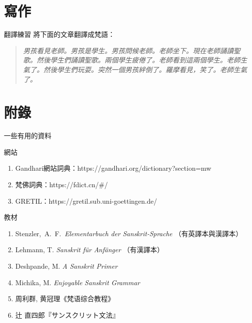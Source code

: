 \documentclass[aspectratio=169]{beamer}
\begin{document}
\section{寫作}
\begin{frame}{翻譯練習}
    將下面的文章翻譯成梵語：
    \begin{quotation}
        \rmfamily\itshape
        男孩看見老師。男孩是學生。男孩問候老師。老師坐下。現在老師誦讀聖歌。然後學生們誦讀聖歌。兩個學生疲倦了。老師看到這兩個學生。老師生氣了。然後學生們玩耍。突然一個男孩絆倒了。羅摩看見，笑了。老師生氣了。
    \end{quotation}
\end{frame}

\section{附錄}
\begin{frame}{一些有用的資料}
    \begin{block}{網站}
        \begin{enumerate}
            \item Gandhari網站詞典：https://gandhari.org/dictionary?section=mw
            \item 梵佛詞典：https://fdict.cn/\#/
            \item GRETIL：https://gretil.sub.uni-goettingen.de/
        \end{enumerate}
    \end{block}

    \begin{block}{教材}
        \begin{enumerate}
            \item Stenzler, A. F. \textit{Elementarbuch der Sanskrit-Sprache} （有英譯本與漢譯本）
            \item Lehmann, T. \textit{Sanskrit für Anfänger} （有漢譯本）
            \item Deshpande, M. \textit{A Sanskrit Primer}
            \item Michika, M. \textit{Enjoyable Sanskrit Grammar}
            \item 周利群, 黄冠理《梵语综合教程》
            \item 辻 直四郎『サンスクリット文法』
        \end{enumerate}
    \end{block}
\end{frame}
\end{document}
